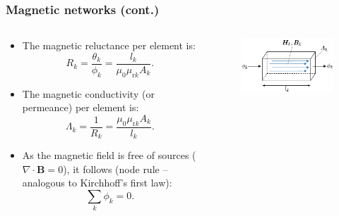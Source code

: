 \begin{frame}
	\frametitle{Magnetic networks (cont.)}
	\begin{columns}
		\begin{column}{0.575\textwidth}
			\begin{itemize}
                \item The magnetic reluctance per element is:
                \begin{equation}
                    R_k = \frac{\theta_k}{\phi_k} = \frac{l_k}{\mu_0\mu_{\mathrm{r}k}A_k}.
                \end{equation}
                \item The magnetic conductivity (or permeance) per element is:
                \begin{equation}
                    \Lambda_k = \frac{1}{R_k} = \frac{\mu_0\mu_{\mathrm{r}k}A_k}{l_k}.
                \end{equation}
                \item As the magnetic field is free of sources ($\nabla \cdot \bm{B}=0$), it follows (node rule -- analogous to Kirchhoff's first law):
                \begin{equation}
                    \sum_k \phi_k = 0.
                \end{equation}
            \end{itemize}
		\end{column}
        \hfill
		\begin{column}{0.425\textwidth}
			\begin{figure}
				\centering
				\includegraphics[height=0.4\textheight]{fig/lec02/Reluctance_element.pdf}
            \end{figure}
		\end{column}
		\end{columns}
\end{frame}

